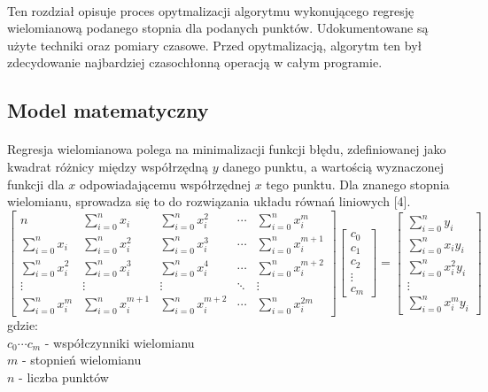 \documentclass[12pt]{report}
\begin{document}
	\paragraph{}
	Ten rozdział opisuje proces opytmalizacji algorytmu wykonującego regresję wielomianową podanego stopnia dla podanych punktów. Udokumentowane są użyte techniki oraz pomiary czasowe. Przed opytmalizacją, algorytm ten był zdecydowanie najbardziej czasochłonną operacją w całym programie.
	
	\subsection{Model matematyczny}
	\paragraph{}
	Regresja wielomianowa polega na minimalizacji funkcji błędu, zdefiniowanej jako kwadrat różnicy między współrzędną $y$ danego punktu, a wartością wyznaczonej funkcji dla $x$ odpowiadającemu współrzędnej $x$ tego punktu. Dla znanego stopnia wielomianu, sprowadza się to do rozwiązania układu równań liniowych [4].
	\begin{equation}
		\begin{bmatrix}
			n & \sum_{i=0}^{n} x_i & \sum_{i=0}^{n} x_i^2 & \cdots & \sum_{i=0}^{n} x_i^m \\
			\sum_{i=0}^{n} x_i & \sum_{i=0}^{n} x_i^2 & \sum_{i=0}^{n} x_i^3 & \cdots & \sum_{i=0}^{n} x_i^{m+1} \\
			\sum_{i=0}^{n} x_i^2 & \sum_{i=0}^{n} x_i^3 & \sum_{i=0}^{n} x_i^4 & \cdots & \sum_{i=0}^{n} x_i^{m+2} \\
			\vdots & \vdots & \vdots & \ddots & \vdots \\
			\sum_{i=0}^{n} x_i^m & \sum_{i=0}^{n} x_i^{m+1} & \sum_{i=0}^{n} x_i^{m+2} & \cdots & \sum_{i=0}^{n} x_i^{2m}
		\end{bmatrix}
		\begin{bmatrix}
			c_0 \\
			c_1 \\
			c_2 \\
			\vdots \\
			c_m
		\end{bmatrix}
		=
		\begin{bmatrix}
			\sum_{i=0}^{n} y_i \\
			\sum_{i=0}^{n} x_i y_i \\
			\sum_{i=0}^{n} x_i^2 y_i \\
			\vdots \\
			\sum_{i=0}^{n} x_i^m y_i
		\end{bmatrix}
	\end{equation}
	gdzie: \\
	$c_0 \cdots c_m$ - współczynniki wielomianu \\
	$m$ - stopnień wielomianu \\
	$n$ - liczba punktów \\
	
\end{document}
